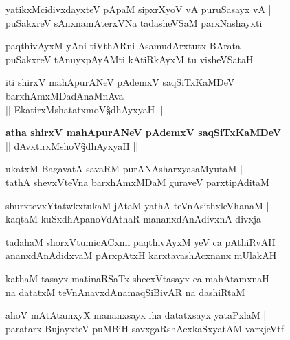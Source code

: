 \begin{shloka}
yatikxMcidivxdayxteV pApaM sipxrXyoV vA puruSasayx vA |\\
puSakxreV sAnxnamAterxVNa tadasheVSaM parxNashayxti
\end{shloka}

\begin{shloka}
paqthivAyxM yAni tiVthARni AsamudArxtutx BArata |\\
puSakxreV tAnuyxpAyAMti kAtiRkAyxM tu visheVSataH 
\end{shloka}

\begin{center}
iti shirxV mahApurANeV pAdemxV saqSiTxKaMDeV barxhAmxMDadAnaMnAva\\
|| EkatirxMshatatxmoV\S dhAyxyaH ||
\end{center}
\newpage

\setcounter{shloka}{0}
\begin{center}
\textbf{\large atha shirxV mahApurANeV pAdemxV saqSiTxKaMDeV}\\
|| dAvxtirxMshoV\S dhAyxyaH ||
\end{center}

\begin{shloka}
ukatxM BagavatA savaRM purANAsharxyasaMyutaM |\\
tathA shevxVteVna barxhAmxMDaM guraveV parxtipAditaM 
\end{shloka}

\begin{shloka}
shurxtevxYtatwkxtukaM jAtaM yathA teVnAsithxleVhanaM |\\
kaqtaM kuSxdhApanoVdAthaR mananxdAnAdivxnA divxja 
\end{shloka}

\begin{shloka}
tadahaM shorxVtumicACxmi paqthivAyxM yeV ca pAthiRvAH |\\
ananxdAnAdidxvaM pArxpAtxH karxtavashAcxnanx mUlakAH
\end{shloka}

\begin{shloka}
kathaM tasayx matinaRSaTx shecxVtasayx ca mahAtamxnaH |\\
na datatxM teVnAnavxdAnamaqSiBivAR na dashiRtaM 
\end{shloka}

\begin{shloka}
ahoV mAtAtamxyX mananxsayx iha datatxsayx yataPxlaM |\\
paratarx BujayxteV puMBiH savxgaRshAcxkaSxyatAM varxjeVtf 
\end{shloka}

